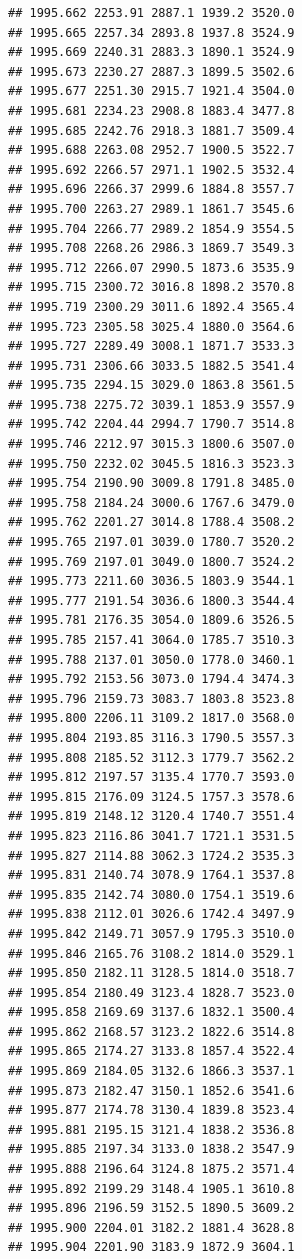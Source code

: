 \documentclass[
]{book}
\begin{document}
\begin{verbatim}
## 1995.662 2253.91 2887.1 1939.2 3520.0
## 1995.665 2257.34 2893.8 1937.8 3524.9
## 1995.669 2240.31 2883.3 1890.1 3524.9
## 1995.673 2230.27 2887.3 1899.5 3502.6
## 1995.677 2251.30 2915.7 1921.4 3504.0
## 1995.681 2234.23 2908.8 1883.4 3477.8
## 1995.685 2242.76 2918.3 1881.7 3509.4
## 1995.688 2263.08 2952.7 1900.5 3522.7
## 1995.692 2266.57 2971.1 1902.5 3532.4
## 1995.696 2266.37 2999.6 1884.8 3557.7
## 1995.700 2263.27 2989.1 1861.7 3545.6
## 1995.704 2266.77 2989.2 1854.9 3554.5
## 1995.708 2268.26 2986.3 1869.7 3549.3
## 1995.712 2266.07 2990.5 1873.6 3535.9
## 1995.715 2300.72 3016.8 1898.2 3570.8
## 1995.719 2300.29 3011.6 1892.4 3565.4
## 1995.723 2305.58 3025.4 1880.0 3564.6
## 1995.727 2289.49 3008.1 1871.7 3533.3
## 1995.731 2306.66 3033.5 1882.5 3541.4
## 1995.735 2294.15 3029.0 1863.8 3561.5
## 1995.738 2275.72 3039.1 1853.9 3557.9
## 1995.742 2204.44 2994.7 1790.7 3514.8
## 1995.746 2212.97 3015.3 1800.6 3507.0
## 1995.750 2232.02 3045.5 1816.3 3523.3
## 1995.754 2190.90 3009.8 1791.8 3485.0
## 1995.758 2184.24 3000.6 1767.6 3479.0
## 1995.762 2201.27 3014.8 1788.4 3508.2
## 1995.765 2197.01 3039.0 1780.7 3520.2
## 1995.769 2197.01 3049.0 1800.7 3524.2
## 1995.773 2211.60 3036.5 1803.9 3544.1
## 1995.777 2191.54 3036.6 1800.3 3544.4
## 1995.781 2176.35 3054.0 1809.6 3526.5
## 1995.785 2157.41 3064.0 1785.7 3510.3
## 1995.788 2137.01 3050.0 1778.0 3460.1
## 1995.792 2153.56 3073.0 1794.4 3474.3
## 1995.796 2159.73 3083.7 1803.8 3523.8
## 1995.800 2206.11 3109.2 1817.0 3568.0
## 1995.804 2193.85 3116.3 1790.5 3557.3
## 1995.808 2185.52 3112.3 1779.7 3562.2
## 1995.812 2197.57 3135.4 1770.7 3593.0
## 1995.815 2176.09 3124.5 1757.3 3578.6
## 1995.819 2148.12 3120.4 1740.7 3551.4
## 1995.823 2116.86 3041.7 1721.1 3531.5
## 1995.827 2114.88 3062.3 1724.2 3535.3
## 1995.831 2140.74 3078.9 1764.1 3537.8
## 1995.835 2142.74 3080.0 1754.1 3519.6
## 1995.838 2112.01 3026.6 1742.4 3497.9
## 1995.842 2149.71 3057.9 1795.3 3510.0
## 1995.846 2165.76 3108.2 1814.0 3529.1
## 1995.850 2182.11 3128.5 1814.0 3518.7
## 1995.854 2180.49 3123.4 1828.7 3523.0
## 1995.858 2169.69 3137.6 1832.1 3500.4
## 1995.862 2168.57 3123.2 1822.6 3514.8
## 1995.865 2174.27 3133.8 1857.4 3522.4
## 1995.869 2184.05 3132.6 1866.3 3537.1
## 1995.873 2182.47 3150.1 1852.6 3541.6
## 1995.877 2174.78 3130.4 1839.8 3523.4
## 1995.881 2195.15 3121.4 1838.2 3536.8
## 1995.885 2197.34 3133.0 1838.2 3547.9
## 1995.888 2196.64 3124.8 1875.2 3571.4
## 1995.892 2199.29 3148.4 1905.1 3610.8
## 1995.896 2196.59 3152.5 1890.5 3609.2
## 1995.900 2204.01 3182.2 1881.4 3628.8
## 1995.904 2201.90 3183.9 1872.9 3604.1

\end{verbatim}
\end{document}
